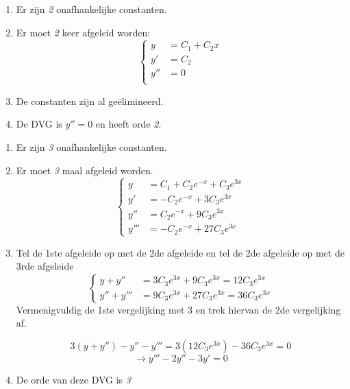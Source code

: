 {

\begin{enumerate}
\item Er zijn \textit{2} onafhankelijke constanten.
\item Er moet \textit{2} keer afgeleid worden:
$$
    \begin{cases}
    y    & = C_1 + C_2x \\
    y'   & = C_2 \\
    y''  & = 0 \\
    \end{cases}
$$
\item De constanten zijn al geëlimineerd. 
\item De DVG is $y'' = 0$ en heeft orde \textit{2}.

\end{enumerate}
}
{
\begin{enumerate}
\item Er zijn \textit{3} onafhankelijke constanten.
\item Er moet \textit{3} maal afgeleid worden.
    \[ 
    \begin{cases}
            y & = C_1 + C_2e^{-x} + C_3e^{3x} \\
    y'     & = -C_2e^{-x} + 3C_3e^{3x}     \\
    y'' & = C_2e^{-x} + 9C_3e^{3x}      \\
    y''' & = -C_2e^{-x} + 27C_3e^{3x}
    \end{cases}
    \]

\item 
Tel de 1ste afgeleide op met de 2de afgeleide en tel de 2de afgeleide op met de 3rde afgeleide
\[
    \begin{cases}
    y + y''    & = 3C_3e^{3x} + 9C_3e^{3x} = 12C_3e^{3x}  \\
    y'' + y''' & = 9C_3e^{3x} + 27C_3e^{3x} = 36C_3e^{3x}
    \end{cases}
\]
Vermenigvuldig de 1ste vergelijking met 3 en trek hiervan de 2de vergelijking af.

$$3(y + y'') - y'' - y''' = 3(12C_3e^{3x}) - 36C_3e^{3x} = 0$$
$$\rightarrow y''' - 2y'' - 3y' = 0$$
\item
De orde van deze DVG is \textit{3}

\end{enumerate}
}
